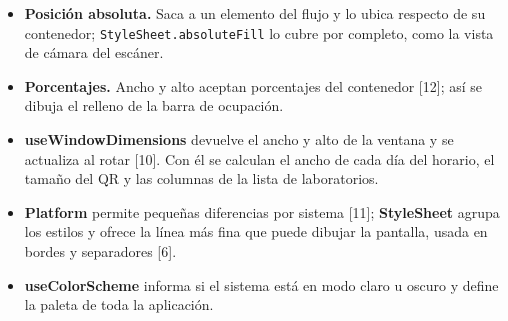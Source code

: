 \begin{itemize}[label=\textcolor{unsared}{\textbullet}, leftmargin=*]
    \item \textbf{Posición absoluta.} Saca a un elemento del flujo y lo ubica respecto de su contenedor; \texttt{Style\allowbreak{}Sheet.\allowbreak{}absolute\allowbreak{}Fill} lo cubre por completo, como la vista de cámara del escáner.
    \item \textbf{Porcentajes.} Ancho y alto aceptan porcentajes del contenedor [12]; así se dibuja el relleno de la barra de ocupación.
    \item \textbf{useWindowDimensions} devuelve el ancho y alto de la ventana y se actualiza al rotar [10]. Con él se calculan el ancho de cada día del horario, el tamaño del QR y las columnas de la lista de laboratorios.
    \item \textbf{Platform} permite pequeñas diferencias por sistema [11]; \textbf{StyleSheet} agrupa los estilos y ofrece la línea más fina que puede dibujar la pantalla, usada en bordes y separadores [6].
    \item \textbf{useColorScheme} informa si el sistema está en modo claro u oscuro y define la paleta de toda la aplicación.
\end{itemize}

\vspace{0.2cm}


